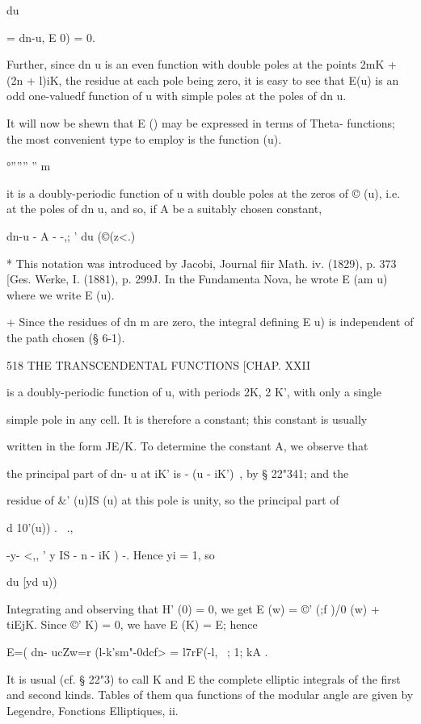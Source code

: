 du

= dn-u, E 0) = 0.

Further, since dn u is an even function with double poles at the
points 2mK + (2n + l)iK, the residue at each pole being zero, it is
easy to see that E(u) is an odd one-valuedf function of u with simple
poles at the poles of dn u.

It will now be shewn that E () may be expressed in terms of Theta-
functions; the most convenient type to employ is the function (u).

 °'''''' '' m %

it is a doubly-periodic function of u with double poles at the zeros
of © (u), i.e. at the poles of dn u, and so, if A be a suitably chosen
constant,

dn-u - A - -,; ' du (©(z<.)

* This notation was introduced by Jacobi, Journal fiir Math. iv.
(1829), p. 373 [Ges. Werke, I. (1881), p. 299J. In the Fundamenta
Nova, he wrote E (am u) where we write E (u).

+ Since the residues of dn m are zero, the integral defining E u) is
independent of the path chosen (§ 6-1).

518 THE TRANSCENDENTAL FUNCTIONS [CHAP. XXII

is a doubly-periodic function of u, with periods 2K, 2 K', with only a
single

simple pole in any cell. It is therefore a constant; this constant is
usually

written in the form JE/K. To determine the constant A, we observe that

the principal part of dn- u at iK' is - (u - iK')~, by § 22"341; and
the

residue of \&' (u)IS (u) at this pole is unity, so the principal part
of

d 10'(u)) . \ .,

-y- <,, ' y IS - n - iK ) -. Hence yi = 1, so

du [yd u))

Integrating and observing that H' (0) = 0, we get E (w) = ©' (;f )/0
(w) + tiEjK. Since ©' K) = 0, we have E (K) = E; hence

E=( dn- ucZw=r (l-k'sm"-0dcf> = l7rF(-l, ~; 1; kA .

It is usual (cf. § 22"3) to call K and E the complete elliptic
integrals of the first and second kinds. Tables of them qua functions
of the modular angle are given by Legendre, Fonctions Elliptiques, ii.


